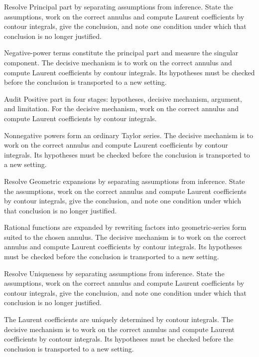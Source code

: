 \begin{problem}\label{prob:iv08-problem-04}
Resolve Principal part by separating assumptions from inference. State the assumptions, work on the correct annulus and compute Laurent coefficients by contour integrals, give the conclusion, and note one condition under which that conclusion is no longer justified.
\end{problem}
\begin{solution}
Negative-power terms constitute the principal part and measure the singular component. The decisive mechanism is to work on the correct annulus and compute Laurent coefficients by contour integrals. Its hypotheses must be checked before the conclusion is transported to a new setting.
\end{solution}

\begin{problem}\label{prob:iv08-problem-05}
Audit Positive part in four stages: hypotheses, decisive mechanism, argument, and limitation. For the decisive mechanism, work on the correct annulus and compute Laurent coefficients by contour integrals.
\end{problem}
\begin{solution}
Nonnegative powers form an ordinary Taylor series. The decisive mechanism is to work on the correct annulus and compute Laurent coefficients by contour integrals. Its hypotheses must be checked before the conclusion is transported to a new setting.
\end{solution}

\begin{problem}\label{prob:iv08-problem-06}
Resolve Geometric expansions by separating assumptions from inference. State the assumptions, work on the correct annulus and compute Laurent coefficients by contour integrals, give the conclusion, and note one condition under which that conclusion is no longer justified.
\end{problem}
\begin{solution}
Rational functions are expanded by rewriting factors into geometric-series form suited to the chosen annulus. The decisive mechanism is to work on the correct annulus and compute Laurent coefficients by contour integrals. Its hypotheses must be checked before the conclusion is transported to a new setting.
\end{solution}

\begin{problem}\label{prob:iv08-problem-07}
Resolve Uniqueness by separating assumptions from inference. State the assumptions, work on the correct annulus and compute Laurent coefficients by contour integrals, give the conclusion, and note one condition under which that conclusion is no longer justified.
\end{problem}
\begin{solution}
The Laurent coefficients are uniquely determined by contour integrals. The decisive mechanism is to work on the correct annulus and compute Laurent coefficients by contour integrals. Its hypotheses must be checked before the conclusion is transported to a new setting.
\end{solution}

